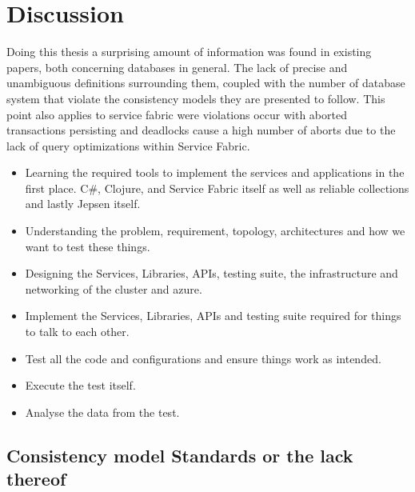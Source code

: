 \documentclass[a4paper,10pt,titlepage]{report}
\begin{document}
\chapter{Discussion}

Doing this thesis a surprising amount of information was found in existing papers, both concerning databases in general. The lack of precise and unambiguous definitions surrounding them, coupled with the number of database system that violate the consistency models they are presented to follow. This point also applies to service fabric were violations occur with aborted transactions persisting and deadlocks cause a high number of aborts due to the lack of query optimizations within Service Fabric.\\ \vspace{5mm}

    \begin{itemize}
        \item Learning the required tools to implement the services and applications in the first place. C\#, Clojure, and Service Fabric itself as well as reliable collections and lastly Jepsen itself.
        \item Understanding the problem, requirement, topology, architectures and how we want to test these things.
        \item Designing the Services, Libraries, APIs, testing suite, the infrastructure and networking of the cluster and azure.
        \item Implement the Services, Libraries, APIs and testing suite required for things to talk to each other.
        \item Test all the code and configurations and ensure things work as intended.
        \item Execute the test itself.
        \item Analyse the data from the test.
    \end{itemize}
    

\section{Consistency model Standards or the lack thereof}
\end{document}
